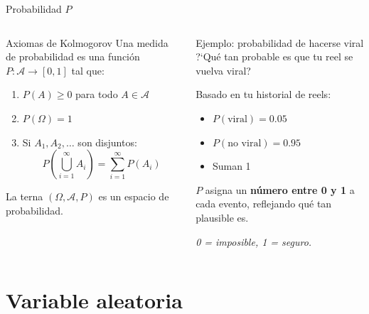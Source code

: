 \documentclass[aspectratio=169, 11pt]{beamer}
\begin{document}
\begin{frame}{Probabilidad $P$}
\begin{columns}[T]
\begin{block}{Axiomas de Kolmogorov}
Una \alert{medida de probabilidad} es una funci\'on $P: \mathcal{A} \to [0,1]$ tal que:

\vspace{0.3em}
\begin{enumerate}
  \item $P(A) \geq 0$ para todo $A \in \mathcal{A}$
  \item $P(\Omega) = 1$
  \item Si $A_1, A_2, \dots$ son disjuntos:
  \[
    P\!\left(\bigcup_{i=1}^{\infty} A_i\right) = \sum_{i=1}^{\infty} P(A_i)
  \]
\end{enumerate}

\vspace{0.3em}
La terna $(\Omega, \mathcal{A}, P)$ es un \alert{espacio de probabilidad}.
\end{block}

\begin{exampleblock}{Ejemplo: probabilidad de hacerse viral}
?`Qu\'e tan probable es que tu reel se vuelva viral?

\vspace{0.3em}
Basado en tu historial de reels:
\begin{itemize}
  \item $P(\text{viral}) = 0.05$
  \item $P(\text{no viral}) = 0.95$
  \item Suman 1 \checkmark
\end{itemize}

\vspace{0.3em}
$P$ asigna un \textbf{n\'umero entre 0 y 1} a cada evento, reflejando qu\'e tan plausible es.

\vspace{0.3em}
\textit{0 = imposible, 1 = seguro.}
\end{exampleblock}
\end{columns}
\end{frame}

\section{Variable aleatoria}
\end{document}
